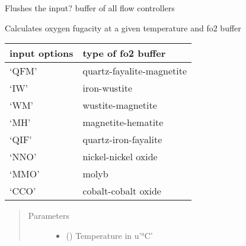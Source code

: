 \documentclass[letterpaper,10pt,english]{sphinxmanual}
\begin{document}
\begin{fulllineitems}
\begin{fulllineitems}
\label{\detokenize{source/laboratory.drivers:laboratory.drivers.mfc.MFC.flush_all}}
Flushes the input? buffer of all flow controllers

\end{fulllineitems}


\begin{fulllineitems}
\label{\detokenize{source/laboratory.drivers:laboratory.drivers.mfc.MFC.fo2_buffer}}
Calculates oxygen fugacity at a given temperature and fo2 buffer


\begin{savenotes}\sphinxattablestart
\centering
\begin{tabulary}{\linewidth}[t]{|T|T|}
\hline
\sphinxstyletheadfamily 
input options
&\sphinxstyletheadfamily 
type of fo2 buffer
\\
\hline
‘QFM’
&
quartz-fayalite-magnetite
\\
\hline
‘IW’
&
iron-wustite
\\
\hline
‘WM’
&
wustite-magnetite
\\
\hline
‘MH’
&
magnetite-hematite
\\
\hline
‘QIF’
&
quartz-iron-fayalite
\\
\hline
‘NNO’
&
nickel-nickel oxide
\\
\hline
‘MMO’
&
molyb
\\
\hline
‘CCO’
&
cobalt-cobalt oxide
\\
\hline
\end{tabulary}
\par
\sphinxattableend\end{savenotes}
\begin{quote}\begin{description}
\item[{Parameters}] \leavevmode\begin{itemize}
\item {} 
 (\sphinxstyleliteralemphasis{\sphinxupquote{, }}) \textendash{} Temperature in u’°C’


\end{itemize}
\end{description}
\end{quote}
\end{fulllineitems}
\end{fulllineitems}
\end{document}
